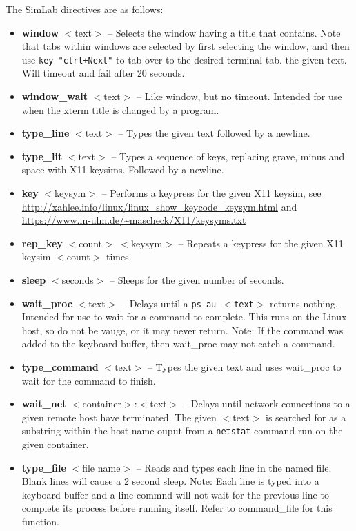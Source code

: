 \documentclass[12pt]{article}
\begin{document}
The SimLab directives are as follows:
\begin{itemize}
\item \textbf{window} $<$text$>$ -- Selects the window having a title that contains.  Note that
tabs within windows are selected by first selecting the window, and then use {\tt key "ctrl+Next"}
to tab over to the desired terminal tab.
the given text.  Will timeout and fail after 20 seconds.
\item \textbf{window\_wait} $<$text$>$ -- Like window, but no timeout.  Intended for
use when the xterm title is changed by a program.
\item \textbf{type\_line} $<$text$>$ -- Types the given text followed by a newline.
\item \textbf{type\_lit} $<$text$>$ -- Types a sequence of keys, replacing grave, minus and space with X11 keysims.
Followed by a newline.
\item \textbf{key} $<$keysym$>$ -- Performs a keypress for the given X11 keysim, see
\url{http://xahlee.info/linux/linux\_show\_keycode\_keysym.html} and 
\url{https://www.in-ulm.de/~mascheck/X11/keysyms.txt}
\item \textbf{rep\_key} $<$count$>$ $<$keysym$>$ -- Repeats a keypress for the given X11 keysim $<$count$>$ times.
\item \textbf{sleep} $<$seconds$>$ -- Sleeps for the given number of seconds.
\item \textbf{wait\_proc} $<$text$>$ -- Delays until a {\tt ps au $<$text$>$} returns nothing.
Intended for use to wait for a command to complete.  This runs on the Linux host, so
do not be vauge, or it may never return. 
Note: If the command was added to the keyboard buffer, then wait\_proc may not catch a command.
\item \textbf{type\_command} $<$text$>$ -- Types the given text and uses wait\_proc to wait for the command to finish.
\item \textbf{wait\_net} $<$container$>$:$<$text$>$ -- Delays until network connections to a given remote
host have terminated.  The given $<$text$>$ is searched for as a substring within the host name ouput
from a {\tt netstat} command run on the given container.
\item \textbf{type\_file} $<$file name$>$ -- Reads and types each line in the named file.
Blank lines will cause a 2 second sleep. Note: Each line is typed into a keyboard buffer and a line commnd will not wait for the previous line to complete its process before running itself. Refer to command\_file for this function.

\end{itemize}
\end{document}
